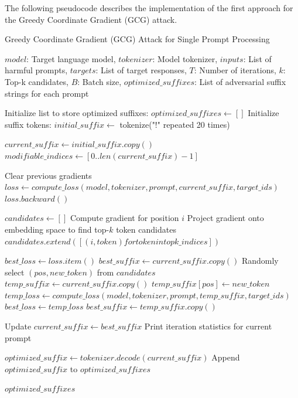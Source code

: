 \documentclass[../main.tex]{subfiles}
\begin{document}
The following pseudocode describes the implementation of the first approach for the Greedy Coordinate Gradient (GCG) attack.
\begin{breakablealgorithm}{Greedy Coordinate Gradient (GCG) Attack for Single Prompt Processing}
\begin{algorithmic}[1]
\Require $model$: Target language model, $tokenizer$: Model tokenizer, 
        $inputs$: List of harmful prompts, $targets$: List of target responses,
        $T$: Number of iterations, $k$: Top-k candidates, $B$: Batch size,
\Ensure $optimized\_suffixes$: List of adversarial suffix strings for each prompt

\State Initialize list to store optimized suffixes: $optimized\_suffixes \gets []$
\State Initialize suffix tokens: $initial\_suffix \gets$ tokenize("!" repeated 20 times)

 
    \State $current\_suffix \gets initial\_suffix.copy()$ 
    \State $modifiable\_indices \gets [0..len(current\_suffix)-1]$ 

     
        \State Clear previous gradients
        \State $loss \gets compute\_loss(model, tokenizer, prompt, current\_suffix, target\_ids)$ 
        \State $loss.backward()$ 
        
        \State $candidates \gets []$
            \State Compute gradient for position $i$
            \State Project gradient onto embedding space to find top-$k$ token candidates
            \State $candidates.extend([(i, token) for token in topk\_indices])$
        \EndFor
        
        \State $best\_loss \gets loss.item()$
        \State $best\_suffix \gets current\_suffix.copy()$
            \State Randomly select $(pos, new\_token)$ from $candidates$
            \State $temp\_suffix \gets current\_suffix.copy()$
            \State $temp\_suffix[pos] \gets new\_token$
            \State $temp\_loss \gets compute\_loss(model, tokenizer, prompt, temp\_suffix, target\_ids)$
                \State $best\_loss \gets temp\_loss$
                \State $best\_suffix \gets temp\_suffix.copy()$
            \EndIf
        \EndFor
        
        \State Update $current\_suffix \gets best\_suffix$
        \State Print iteration statistics for current prompt
    \EndFor
    
    \State $optimized\_suffix \gets tokenizer.decode(current\_suffix)$
    \State Append $optimized\_suffix$ to $optimized\_suffixes$
\EndFor

\State \Return $optimized\_suffixes$
\end{algorithmic}
\end{breakablealgorithm}
\end{document}
